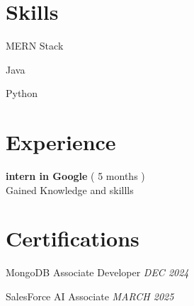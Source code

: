\documentclass[a4paper,10pt]{article}
\begin{document}

\section*{Skills}
\noindent
\begin{compactitem}
    
        \item MERN Stack 
    
        \item Java 
    
        \item Python
    
\end{compactitem}



\section*{Experience}
\noindent
\begin{compactitem}
    
    \item \textbf{ intern in Google }  ( 5 months )  \\
     Gained Knowledge and skillls
    
\end{compactitem}



\section*{Certifications}
\noindent
\begin{compactitem}
    
        \item MongoDB Associate Developer \hfill \textit{ DEC 2024 }
    
        \item SalesForce AI Associate \hfill \textit{ MARCH 2025 }
    
\end{compactitem}
\end{document}
